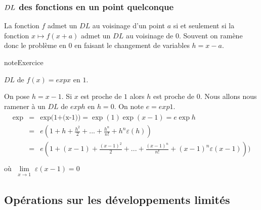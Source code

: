 \documentclass[letterpaper,10pt,french]{jupyterBook}
\begin{document}
\subsubsection{\protect\(DL\protect\) des fonctions en un point quelconque}
\label{\detokenize{dl:dl-des-fonctions-en-un-point-quelconque}}
\sphinxAtStartPar
La fonction \(f\) admet un \(DL\) au voisinage d’un point \(a\) si et seulement si la fonction \(x\mapsto f(x+a)\) admet un \(DL\) au
voisinage de \(0.\) Souvent on ramène donc le problème en \(0\) en faisant le changement de variables \(h=x-a.\)

\begin{sphinxadmonition}{note}{Exercice}

\sphinxAtStartPar
\(DL\) de \(f(x)=exp x\) en \(1.\)

\sphinxAtStartPar
On pose \(h=x-1.\) Si \(x\) est proche de \(1\) alors \(h\) est proche de \(0.\) Nous allons nous ramener à un \(DL\) de \(exp h\) en
\(h = 0.\) On note \(e = exp 1.\)
\begin{equation*}
\begin{split}
\begin{eqnarray*}
\exp 
&=&\mbox{exp(1+(x-1))}=\exp (1)\exp (x-1)=e\exp h\\
&=& e(1+h+\frac{h^2}{2}+...+\frac{h^n}{n!}+h^n \varepsilon(h))\\
&=& e(1+(x-1)+\frac{(x-1)^2}{2}+...+\frac{(x-1)^n}{n!}+(x-1)^n \varepsilon(x-1)))\\
\end{eqnarray*}
\end{split}
\end{equation*}
\sphinxAtStartPar
où \(\lim\limits_{\substack{x \rightarrow 1}}\varepsilon(x-1)=0\)
\end{sphinxadmonition}


\subsection{Opérations sur les développements limités}
\label{\detokenize{dl:operations-sur-les-developpements-limites}}
\end{document}

